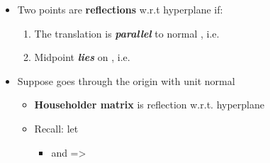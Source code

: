 \begin{itemize}

      \item
            Two points  are
            \textbf{reflections} w.r.t hyperplane
             if:

            \begin{enumerate}
                  \item
                        The translation
                        is \textbf{\emph{parallel}} to normal ,
                        i.e. 
                  \item
                        Midpoint 
                        \textbf{\emph{lies}} on ,
                        i.e. 
            \end{enumerate}
      \item
            Suppose
            goes through the origin with unit normal 

            \begin{itemize}

                  \item
                        \textbf{Householder matrix}
                        is reflection w.r.t. hyperplane 

                  \item
                        Recall: let

                        \tcbbreak

                        \begin{itemize}

                              \item
                                    and
                                    =>
                                    

\end{itemize}
\end{itemize}
\end{itemize}
